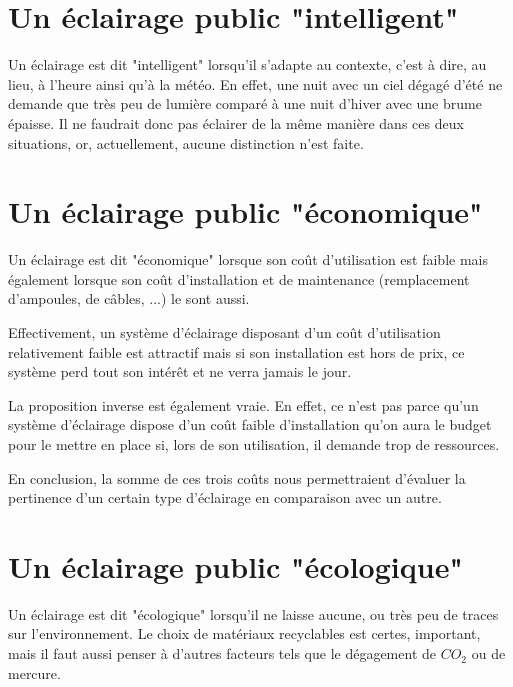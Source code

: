 \section{Un \'eclairage public "intelligent"}



Un \'eclairage est dit "intelligent" lorsqu'il s'adapte au contexte, c'est à dire, au lieu, à l'heure ainsi qu'\`a la m\'et\'eo. En effet, une nuit avec un ciel d\'egag\'e d'\'et\'e ne demande que tr\`es peu de lumi\`ere comparé à une nuit d'hiver avec une brume \'epaisse. Il ne faudrait donc pas éclairer de la même manière dans ces deux situations, or, actuellement, aucune distinction n'est faite. 



\section{Un \'eclairage public "\'economique"}



Un \'eclairage est dit "\'economique" lorsque son co\^ut d'utilisation est faible mais également lorsque son co\^ut d'installation et de maintenance (remplacement d'ampoules, de c\^ables, ...) le sont aussi.

Effectivement, un système d'\'eclairage disposant d'un co\^ut d'utilisation relativement faible est attractif mais si son installation est hors de prix, ce système perd tout son intérêt et ne verra jamais le jour.

 La proposition inverse est également vraie. En effet, ce n'est pas parce qu'un système d'éclairage dispose d'un coût faible d'installation qu'on aura le budget pour le mettre en place si, lors de son utilisation, il demande trop de ressources.

En conclusion, la somme de ces trois co\^uts nous permettraient d'\'evaluer la pertinence d'un certain type d'\'eclairage en comparaison avec un autre.



\section{Un \'eclairage public "\'ecologique"}



Un \'eclairage est dit "\'ecologique" lorsqu'il ne laisse aucune, ou tr\`es peu de traces sur l'environnement. Le choix de mat\'eriaux  recyclables est certes, important, mais il faut aussi penser \`a d'autres facteurs tels que le d\'egagement de $CO_2$ ou de mercure.



